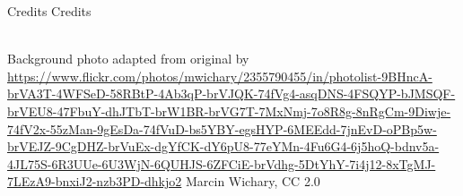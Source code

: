 \documentclass{beamer}
\begin{document}
\begin{frame}{Credits}
Credits

\ \\
Background photo adapted from original by \url{https://www.flickr.com/photos/mwichary/2355790455/in/photolist-9BHncA-brVA3T-4WFSeD-58RBtP-4Ab3qP-brVJQK-74fVg4-asqDNS-4FSQYP-bJMSQF-brVEU8-47FbuY-dhJTbT-brW1BR-brVG7T-7MxNmj-7o8R8g-8nRgCm-9Diwje-74fV2x-55zMan-9gEsDa-74fVuD-bs5YBY-egsHYP-6MEEdd-7jnEvD-oPBp5w-brVEJZ-9CgDHZ-brVuEx-dgYfCK-dY6pU8-77eYMn-4Fu6G4-6j5hoQ-bdnv5a-4JL75S-6R3UUe-6U3WjN-6QUHJS-6ZFCiE-brVdhg-5DtYhY-7i4j12-8xTgMJ-7LEzA9-bnxiJ2-nzb3PD-dhkjo2} Marcin Wichary, CC 2.0
\end{frame}
\end{document}
